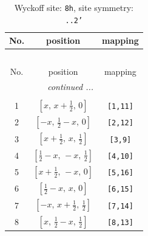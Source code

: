 \documentclass[fleqn,8pt]{jsarticle}
\begin{document}
\begin{longtable}{ccc}
\caption{Wyckoff site: {\tt 8h}, site symmetry: {\tt ..2'}}
 \\
 \hline \hline
No. & position & mapping \\ \hline \endfirsthead

\multicolumn{2}{l}{\tablename\ \thetable{}} \\
 \hline \hline
No. & position & mapping \\ \hline \endhead

 \hline \hline
\multicolumn{2}{r}{\footnotesize\it continued ...} \\ \endfoot

 \hline \hline
\multicolumn{2}{r}{} \\ \endlastfoot

1 & $\left[ x,\, x + \frac{1}{2},\, 0 \right]$ & {\tt [1,11]} \\ \hline
2 & $\left[ - x,\, \frac{1}{2} - x,\, 0 \right]$ & {\tt [2,12]} \\ \hline
3 & $\left[ x + \frac{1}{2},\, x,\, \frac{1}{2} \right]$ & {\tt [3,9]} \\ \hline
4 & $\left[ \frac{1}{2} - x,\, - x,\, \frac{1}{2} \right]$ & {\tt [4,10]} \\ \hline
5 & $\left[ x + \frac{1}{2},\, - x,\, 0 \right]$ & {\tt [5,16]} \\ \hline
6 & $\left[ \frac{1}{2} - x,\, x,\, 0 \right]$ & {\tt [6,15]} \\ \hline
7 & $\left[ - x,\, x + \frac{1}{2},\, \frac{1}{2} \right]$ & {\tt [7,14]} \\ \hline
8 & $\left[ x,\, \frac{1}{2} - x,\, \frac{1}{2} \right]$ & {\tt [8,13]} \\
\end{longtable}
\renewcommand{\arraystretch}{1.2}
\end{document}
